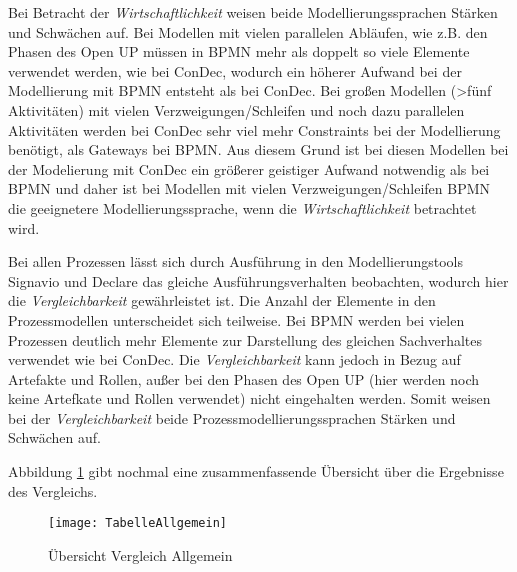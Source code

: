 Bei Betracht der \textit{Wirtschaftlichkeit} weisen beide Modellierungssprachen Stärken und Schwächen auf. Bei Modellen mit vielen parallelen Abläufen, wie z.B. den Phasen des Open UP müssen in BPMN mehr als doppelt so viele Elemente verwendet werden, wie bei ConDec, wodurch ein höherer Aufwand bei der Modellierung mit BPMN entsteht als bei ConDec.\newline
Bei großen Modellen (>fünf Aktivitäten) mit vielen Verzweigungen/Schleifen und noch dazu parallelen Aktivitäten werden bei ConDec sehr viel mehr Constraints bei der Modellierung benötigt, als Gateways bei BPMN. Aus diesem Grund ist bei diesen Modellen bei der Modelierung mit ConDec ein größerer geistiger Aufwand notwendig als bei BPMN und daher ist bei Modellen mit vielen Verzweigungen/Schleifen BPMN die geeignetere Modellierungssprache, wenn die \textit{Wirtschaftlichkeit} betrachtet wird.\newline

Bei allen Prozessen lässt sich durch Ausführung in den Modellierungstools Signavio und Declare das gleiche Ausführungsverhalten beobachten, wodurch hier die \textit{Vergleichbarkeit} gewährleistet ist. \newline
Die Anzahl der Elemente in den Prozessmodellen unterscheidet sich teilweise. Bei BPMN werden bei vielen Prozessen deutlich mehr Elemente zur Darstellung des gleichen Sachverhaltes verwendet wie bei ConDec.\newline
Die \textit{Vergleichbarkeit} kann jedoch in Bezug auf Artefakte und Rollen, außer bei den Phasen des Open UP (hier werden noch keine Artefkate und Rollen verwendet) nicht eingehalten werden.\newline
Somit weisen bei der \textit{Vergleichbarkeit} beide Prozessmodellierungssprachen Stärken und Schwächen auf. \newline


Abbildung \ref{fig:TabelleAllgemein} gibt nochmal eine zusammenfassende Übersicht über die Ergebnisse des Vergleichs. 



 \begin{figure}[!htbp]
\begin{center}
  \texttt{[image: TabelleAllgemein]} %
  \caption{Übersicht Vergleich Allgemein}
  \label{fig:TabelleAllgemein}
\end{center}
\end{figure}







